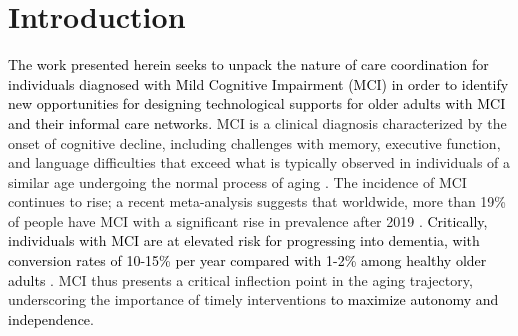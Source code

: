\documentclass[acmsmall]{acmart}
\begin{document}


\maketitle

\section{Introduction}

\textcolor{black}{The work presented herein seeks to unpack the nature of care coordination for individuals diagnosed with Mild Cognitive Impairment (MCI) in order to identify new opportunities for designing technological supports for older adults with MCI and their informal care networks.} MCI is a clinical diagnosis characterized by the onset of cognitive decline, including challenges with memory, executive function, and language difficulties that exceed what is typically observed in individuals of a similar age undergoing the normal process of aging \cite{petersen1997aging, petersen2014mild}. The incidence of MCI continues to rise; a recent meta-analysis suggests that worldwide, more than 19\% of people have MCI with a significant rise in prevalence after 2019 \cite{song2023evidence}. \textcolor{black}{Critically, individuals with MCI are at elevated risk for progressing into dementia, with conversion rates of 10-15\% per year compared with 1-2\% among healthy older adults \cite{winblad2016defeating, wang2022management}}. MCI thus presents a critical inflection point in the aging trajectory, underscoring the importance of timely interventions \textcolor{black}{to maximize autonomy and independence}. 
\end{document}
